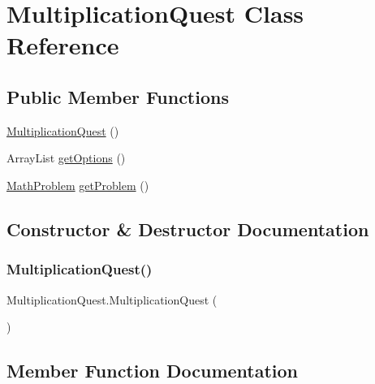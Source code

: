 \hypertarget{classMultiplicationQuest}{}\section{Multiplication\+Quest Class Reference}
\label{classMultiplicationQuest}
\subsection*{Public Member Functions}
\begin{DoxyCompactItemize}
\item 
\hyperlink{classMultiplicationQuest_a9dc6c13199e52dbf14f5c90ef4cb01bc}{Multiplication\+Quest} ()
\item 
Array\+List \hyperlink{classMultiplicationQuest_ae0605699f6492527d3ccc54184415463}{get\+Options} ()
\item 
\hyperlink{classMathProblem}{Math\+Problem} \hyperlink{classMultiplicationQuest_a15282e5bfe52cf5d034c11b8eeff3a72}{get\+Problem} ()
\end{DoxyCompactItemize}


\subsection{Constructor \& Destructor Documentation}
\mbox{\label{classMultiplicationQuest_a9dc6c13199e52dbf14f5c90ef4cb01bc}} 
\subsubsection{\texorpdfstring{Multiplication\+Quest()}{MultiplicationQuest()}}
{\footnotesize\ttfamily Multiplication\+Quest.\+Multiplication\+Quest (\begin{DoxyParamCaption}{ }\end{DoxyParamCaption})\hspace{0.3cm}{\ttfamily [inline]}}



\subsection{Member Function Documentation}
\mbox{\label{classMultiplicationQuest_ae0605699f6492527d3ccc54184415463}} 
